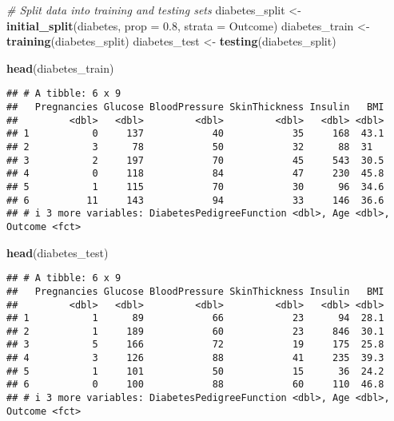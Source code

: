 \documentclass[
]{article}
\newenvironment{Shaded}{\begin{snugshade}}{\end{snugshade}}
\newcommand{\AttributeTok}[1]{\textcolor[rgb]{0.13,0.29,0.53}{#1}}
\newcommand{\CommentTok}[1]{\textcolor[rgb]{0.56,0.35,0.01}{\textit{#1}}}
\newcommand{\FloatTok}[1]{\textcolor[rgb]{0.00,0.00,0.81}{#1}}
\newcommand{\FunctionTok}[1]{\textcolor[rgb]{0.13,0.29,0.53}{\textbf{#1}}}
\newcommand{\NormalTok}[1]{#1}
\newcommand{\OtherTok}[1]{\textcolor[rgb]{0.56,0.35,0.01}{#1}}
\begin{document}
\begin{Shaded}
\begin{Highlighting}[]
\CommentTok{\# Split data into training and testing sets}
\NormalTok{diabetes\_split }\OtherTok{\textless{}{-}} \FunctionTok{initial\_split}\NormalTok{(diabetes, }\AttributeTok{prop =} \FloatTok{0.8}\NormalTok{, }\AttributeTok{strata =}\NormalTok{ Outcome)}
\NormalTok{diabetes\_train }\OtherTok{\textless{}{-}} \FunctionTok{training}\NormalTok{(diabetes\_split)}
\NormalTok{diabetes\_test }\OtherTok{\textless{}{-}} \FunctionTok{testing}\NormalTok{(diabetes\_split)}
\end{Highlighting}
\end{Shaded}

\begin{Shaded}
\begin{Highlighting}[]
\FunctionTok{head}\NormalTok{(diabetes\_train)}
\end{Highlighting}
\end{Shaded}

\begin{verbatim}
## # A tibble: 6 x 9
##   Pregnancies Glucose BloodPressure SkinThickness Insulin   BMI
##         <dbl>   <dbl>         <dbl>         <dbl>   <dbl> <dbl>
## 1           0     137            40            35     168  43.1
## 2           3      78            50            32      88  31  
## 3           2     197            70            45     543  30.5
## 4           0     118            84            47     230  45.8
## 5           1     115            70            30      96  34.6
## 6          11     143            94            33     146  36.6
## # i 3 more variables: DiabetesPedigreeFunction <dbl>, Age <dbl>, Outcome <fct>
\end{verbatim}

\begin{Shaded}
\begin{Highlighting}[]
\FunctionTok{head}\NormalTok{(diabetes\_test)}
\end{Highlighting}
\end{Shaded}

\begin{verbatim}
## # A tibble: 6 x 9
##   Pregnancies Glucose BloodPressure SkinThickness Insulin   BMI
##         <dbl>   <dbl>         <dbl>         <dbl>   <dbl> <dbl>
## 1           1      89            66            23      94  28.1
## 2           1     189            60            23     846  30.1
## 3           5     166            72            19     175  25.8
## 4           3     126            88            41     235  39.3
## 5           1     101            50            15      36  24.2
## 6           0     100            88            60     110  46.8
## # i 3 more variables: DiabetesPedigreeFunction <dbl>, Age <dbl>, Outcome <fct>
\end{verbatim}
\end{document}
